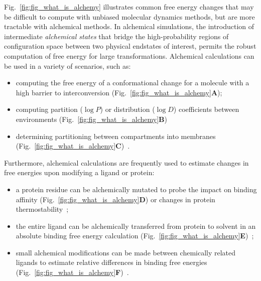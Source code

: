 \documentclass[9pt,bestpractices,pubversion]{livecoms}
\begin{document}
Fig.~\ref{fig:fig_what_is_alchemy} illustrates common free energy changes that may be difficult to compute with unbiased molecular dynamics methods, but are more tractable with alchemical methods.
In alchemical simulations, the introduction of intermediate \textit{alchemical states} that bridge the high-probability regions of configuration space between two physical endstates of interest, permits the robust computation of free energy for large transformations.
Alchemical calculations can be used in a variety of scenarios, such as: 
\begin{itemize}
\item computing the free energy of a conformational change for a molecule with a high barrier to interconversion (Fig.~\ref{fig:fig_what_is_alchemy}\textbf{A});
\item computing partition ($\log P$) or distribution ($\log D$) coefficients between environments (Fig.~\ref{fig:fig_what_is_alchemy}\textbf{B})~\cite{rustenburg2016measuring, bosisio2016blinded} 
\item determining partitioning between compartments into membranes (Fig.~\ref{fig:fig_what_is_alchemy}\textbf{C})~\cite{corey2019insights}. 
\end{itemize}

Furthermore, alchemical calculations are frequently used to estimate changes in free energies upon modifying a ligand or protein: 
\begin{itemize}
\item a protein residue can be alchemically mutated to probe the impact on binding affinity (Fig.~\ref{fig:fig_what_is_alchemy}\textbf{D})\cite{hauser2018predicting,aldeghi2018accurate} or changes in protein thermostability~\cite{seeliger2010protein,gapsys2016insights,gapsys2016accurate,aldeghi2019accurate}; 
\item the entire ligand can be alchemically transferred from protein to solvent in an absolute binding free energy calculation (Fig.~\ref{fig:fig_what_is_alchemy}\textbf{E})~\cite{mobley2007predicting,aldeghi2015accurate,aldeghi2017predictions}; 
\item small alchemical modifications can be made between chemically related ligands to estimate relative differences in binding free energies (Fig.~\ref{fig:fig_what_is_alchemy}\textbf{F})~\cite{wang2015accurate,mey2016blinded,song2019using,gapsys2020large,kuhn2020assessment}.
\end{itemize}
\end{document}
